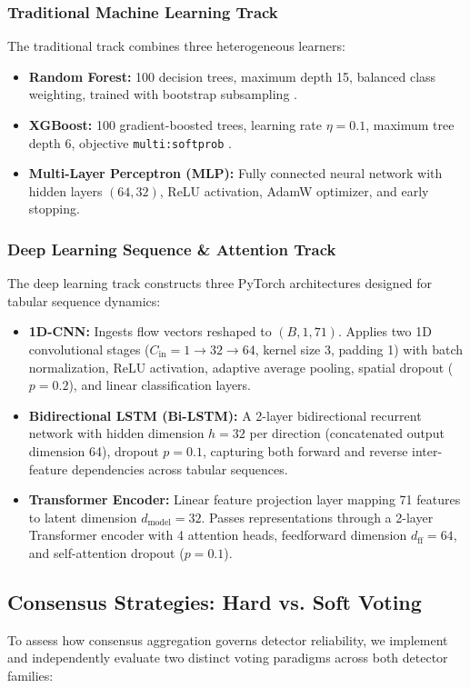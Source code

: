 \documentclass[conference]{IEEEtran}
\begin{document}
\subsubsection{Traditional Machine Learning Track}
The traditional track combines three heterogeneous learners:
\begin{itemize}
    \item \textbf{Random Forest:} 100 decision trees, maximum depth 15, balanced class weighting, trained with bootstrap subsampling \cite{breiman2001random}.
    \item \textbf{XGBoost:} 100 gradient-boosted trees, learning rate $\eta=0.1$, maximum tree depth 6, objective \texttt{multi:softprob} \cite{chen2016xgboost}.
    \item \textbf{Multi-Layer Perceptron (MLP):} Fully connected neural network with hidden layers $(64, 32)$, ReLU activation, AdamW optimizer, and early stopping.
\end{itemize}

\subsubsection{Deep Learning Sequence \& Attention Track}
The deep learning track constructs three PyTorch architectures designed for tabular sequence dynamics:
\begin{itemize}
    \item \textbf{1D-CNN:} Ingests flow vectors reshaped to $(B, 1, 71)$. Applies two 1D convolutional stages ($C_{\text{in}}=1 \to 32 \to 64$, kernel size 3, padding 1) with batch normalization, ReLU activation, adaptive average pooling, spatial dropout ($p=0.2$), and linear classification layers.
    \item \textbf{Bidirectional LSTM (Bi-LSTM):} A 2-layer bidirectional recurrent network with hidden dimension $h=32$ per direction (concatenated output dimension 64), dropout $p=0.1$, capturing both forward and reverse inter-feature dependencies across tabular sequences.
    \item \textbf{Transformer Encoder:} Linear feature projection layer mapping 71 features to latent dimension $d_{\text{model}}=32$. Passes representations through a 2-layer Transformer encoder with 4 attention heads, feedforward dimension $d_{\text{ff}}=64$, and self-attention dropout ($p=0.1$).
\end{itemize}

\subsection{Consensus Strategies: Hard vs. Soft Voting}
To assess how consensus aggregation governs detector reliability, we implement and independently evaluate two distinct voting paradigms across both detector families:
\end{document}
